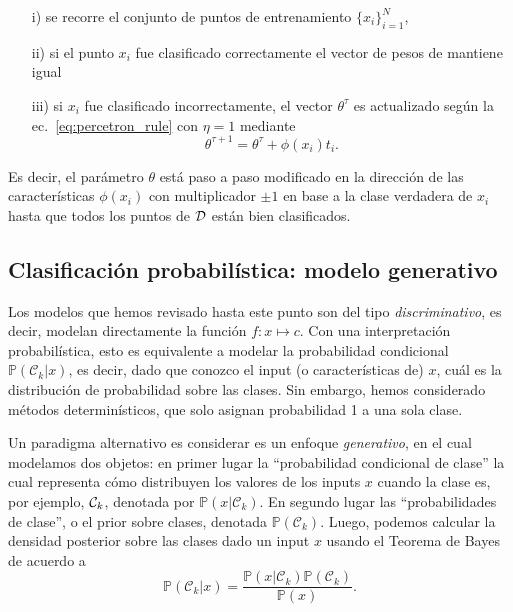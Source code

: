\begin{itemize}
	\item[i)] se recorre el conjunto de puntos de entrenamiento $\{x_i\}_{i=1}^N$,
	\item[ii)] si el punto $x_i$ fue clasificado correctamente el vector de pesos de mantiene igual
	\item[iii)] si $x_i$ fue clasificado incorrectamente, el vector $\theta^\tau$ es actualizado según la ec.~\eqref{eq:percetron_rule} con $\eta=1$ mediante
	\begin{equation}
	 \theta^{\tau+1} = \theta^\tau + \phi(x_i)t_i.
\end{equation}
\end{itemize}
Es decir, el parámetro $\theta$ está paso a paso modificado en la dirección de las características $\phi(x_i)$ con multiplicador $\pm1$ en base a la clase verdadera de $x_i$ hasta  que todos los puntos de ${\mathcal D}$ están bien clasificados. 




\subsection{Clasificación probabilística: modelo generativo}

Los modelos que hemos revisado hasta este punto son del tipo \emph{discriminativo}, es decir, modelan directamente la función $f:x\mapsto c$. Con una interpretación probabilística, esto es equivalente a modelar la probabilidad condicional $\mathbb{P}(\mathcal{C}_k|x)$, es decir, dado que conozco el input (o características de) $x$, cuál es la distribución de probabilidad sobre las clases. Sin embargo, hemos considerado métodos determinísticos, que solo asignan probabilidad 1 a una sola clase. 


Un paradigma alternativo es considerar es un enfoque \emph{generativo}, en el cual modelamos dos  objetos: en primer lugar la ``probabilidad condicional de clase'' la cual representa cómo distribuyen los valores de los inputs $x$ cuando la  clase es, por  ejemplo, ${\mathcal C}_k$, denotada por $\mathbb{P}(x|\mathcal{C}_k)$. En segundo lugar las ``probabilidades de clase'', o el prior sobre clases, denotada $\mathbb{P}(\mathcal{C}_k)$. Luego, podemos calcular la densidad posterior sobre las clases dado un input $x$ usando el Teorema de Bayes de acuerdo a 
\begin{equation}
	\mathbb{P}(\mathcal{C}_k|x) = \frac{\mathbb{P}(x|\mathcal{C}_k)\mathbb{P}(\mathcal{C}_k)}{\mathbb{P}(x)}.
\end{equation}

